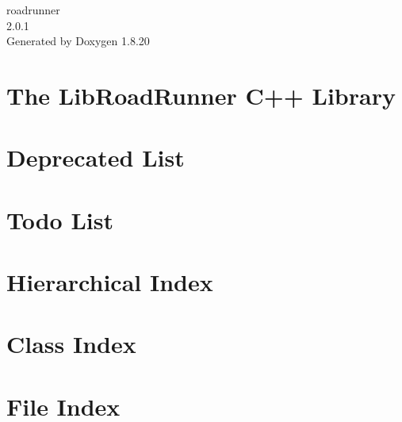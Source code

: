 \let\mypdfximage\pdfximage\def\pdfximage{\immediate\mypdfximage}\documentclass[twoside]{book}
\newcommand{\+}{\discretionary{\mbox{\scriptsize$\hookleftarrow$}}{}{}}
\newcommand{\clearemptydoublepage}{%
  \newpage{\pagestyle{empty}\cleardoublepage}%
}
\begin{document}
\hypersetup{pageanchor=false,
             bookmarksnumbered=true,
             pdfencoding=unicode
            }
\begin{titlepage}
\vspace*{7cm}
\begin{center}%
{\Large roadrunner \\[1ex]\large 2.\+0.\+1 }\\
\vspace*{1cm}
{\large Generated by Doxygen 1.8.20}\\
\end{center}
\end{titlepage}
\clearemptydoublepage
{}
\tableofcontents
\clearemptydoublepage
{}
\hypersetup{pageanchor=true}

\chapter{The Lib\+Road\+Runner C++ Library}
\label{index}\hypertarget{index}{}
\chapter{Deprecated List}
\label{deprecated}

\chapter{Todo List}
\label{todo}

\chapter{Hierarchical Index}

\chapter{Class Index}

\chapter{File Index}

\end{document}
